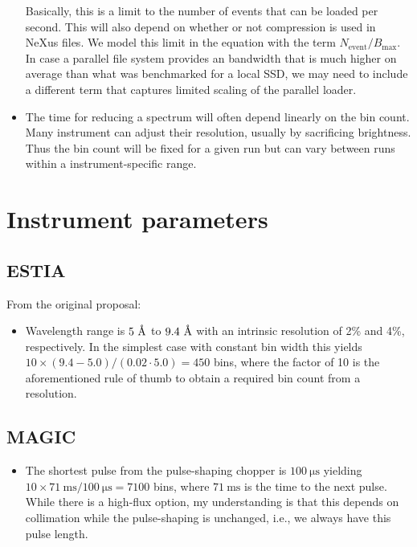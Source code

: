 \documentclass[a4paper,english,numbers=noenddot,bibliography=totoc,chapterprefix=on,DIV=12]{scrartcl}
\newcommand{\angstrom}{\textup{\AA}}
\newcommand{\Nevent}{N_{\text{event}}}
\newcommand{\Bmax}{B_{\text{max}}}
\newcommand{\estia}{ESTIA\xspace}
\newcommand{\magic}{MAGIC\xspace}
\begin{document}
\begin{itemize}
  Basically, this is a limit to the number of events that can be loaded per second.
  This will also depend on whether or not compression is used in NeXus files.
  We model this limit in the equation with the term $\Nevent/\Bmax$.
  In case a parallel file system provides an bandwidth that is much higher on average than what was benchmarked for a local SSD, we may need to include a different term that captures limited scaling of the parallel loader.
\item The time for reducing a spectrum will often depend linearly on the bin count.
  Many instrument can adjust their resolution, usually by sacrificing brightness.
  Thus the bin count will be fixed for a given run but can vary between runs within a instrument-specific range.
\end{itemize}

\section{Instrument parameters}

\subsection{\estia}

From the original proposal:

\begin{itemize}
  \item Wavelength range is $5~\angstrom$ to $9.4~\angstrom$ with an intrinsic resolution of 2\% and 4\%, respectively.
    In the simplest case with constant bin width this yields $10\times(9.4-5.0)/(0.02\cdot5.0) = 450$ bins, where the factor of 10 is the aforementioned rule of thumb to obtain a required bin count from a resolution.
\end{itemize}

\subsection{\magic}

\begin{itemize}
  \item The shortest pulse from the pulse-shaping chopper is $100~\mathrm{\mu s}$ yielding $10\times71~\mathrm{ms}/100~\mathrm{\mu s} = 7100$ bins, where $71~\mathrm{ms}$ is the time to the next pulse.
    While there is a high-flux option, my understanding is that this depends on collimation while the pulse-shaping is unchanged, i.e., we always have this pulse length.
\end{itemize}
\end{document}
